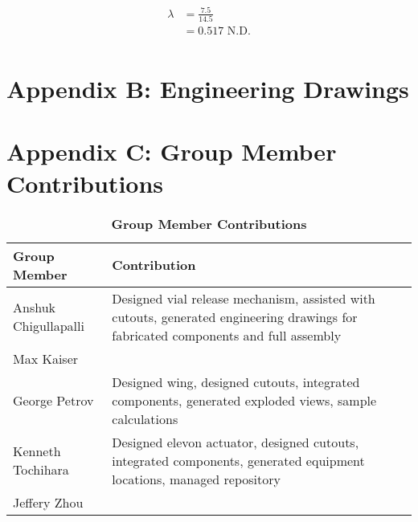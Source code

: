 \begin{enumerate}[wide,label=\textbf{\arabic*}., labelindent=0pt]
        \begin{align*}
            \lambda &= \frac{7.5}{14.5}\\
            &= 0.517 \text{ N.D.}\\
        \end{align*}    
 
\section*{Appendix B: Engineering Drawings}\label{ApxB}











\section*{Appendix C: Group Member Contributions}

    \begin{table}[H]
        \begin{center} 
        \caption{\textbf{Group Member Contributions}}
        \begin{tabular}{ | p{2in} | p{4in}| } 
            \hline
            \textbf{Group Member} & \textbf{Contribution} \\  \hline
            Anshuk Chigullapalli & Designed vial release mechanism, assisted with cutouts, generated engineering drawings for fabricated components and full assembly\\ \hline
            Max Kaiser & \\ \hline
            George Petrov & Designed wing, designed cutouts, integrated components, generated exploded views, sample calculations \\ \hline
            Kenneth Tochihara & Designed elevon actuator, designed cutouts, integrated components, generated equipment locations, managed repository \\ \hline
            Jeffery Zhou & \\ \hline
        \end{tabular}
        \end{center}
    \end{table}
    
\end{enumerate}
